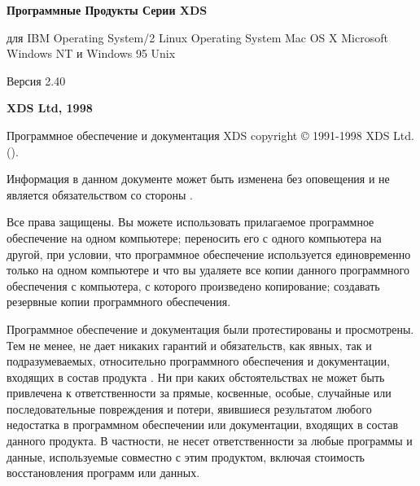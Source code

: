 %
%


\begin{titlepage}


\begin{center}
\Large\bf Программные Продукты Серии XDS 
\end{center}
\vspace{1 in}
\begin{center}
\Huge \bf
\ifcommon
\else
  \ProductName
  \par \Large для
  \ifosii       IBM Operating System/2
  \else\iflinux Linux Operating System
  \else\ifmacosx Mac OS X
  \else\ifwinnt Microsoft Windows NT и Windows 95
  \else\ifunix  Unix
  \else\JNO
  \fi\fi\fi\fi\fi
  \par \Large Версия 2.40
  \vfill
\fi %
\end{center}
\begin{center}
\huge\bf \BookName{}
\end{center}

\vfill
\begin{center} \Large\bf
XDS Ltd, 1998
\end{center}

\pagebreak
\thispagestyle{empty}
\setcounter{page}{0}
{\small

Программное обеспечение и документация XDS copyright \copyright{}
1991-1998 XDS Ltd. (\XDS{}). 

Информация в данном документе может быть изменена без оповещения 
и не является обязательством со стороны \XDS{}.

Все права защищены. Вы можете использовать прилагаемое программное
обеспечение на одном компьютере; переносить его с одного компьютера на
другой, при условии, что программное обеспечение используется единовременно
только на одном компьютере и что вы удаляете все копии данного программного 
обеспечения с компьютера, с которого произведено копирование; создавать
резервные копии программного обеспечения.

Программное обеспечение и документация \XDS{} были протестированы и 
просмотрены. Тем не менее, \XDS{} не дает никаких гарантий и обязательств,
как явных, так и подразумеваемых, относительно программного обеспечения и
документации, входящих в состав продукта \XDS{}. Ни при каких обстоятельствах
\XDS{} не может быть привлечена к ответственности за прямые, косвенные,
особые, случайные или последовательные повреждения и потери, явившиеся
результатом любого недостатка в программном обеспечении или документации,
входящих в состав данного продукта. В частности, \XDS{} не несет 
ответственности за любые программы и данные, используемые совместно с этим
продуктом, включая стоимость восстановления программ или данных.

}
\end{titlepage}
